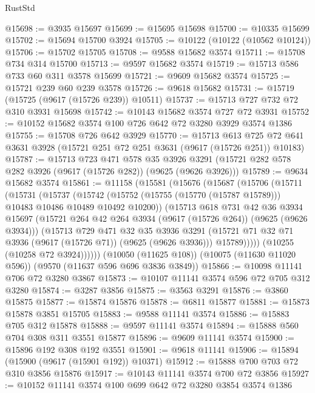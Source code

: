 \begin{lexlean}{RustStd}
\begin{coremodule}
{\begin{coremodule}
{{{{{{{{{{{{{{{{{{{{{{{{{{{{{{{{{@15698 := @3935 @15697
@15699 := @15695 @15698
@15700 := @10335 @15699
@15702 := @15694 @15700 @3924
@15705 := @10122 (@10122 (@10562 @10124))
@15706 := @15702 @15705
@15708 := @9588 @15682 @3574
@15711 := @15708 @734 @314 @15700
@15713 := @9597 @15682 @3574
@15719 := @15713 @586 @733 @60 @311 @3578 @15699
@15721 := @9609 @15682 @3574
@15725 := @15721 @239 @60 @239 @3578
@15726 := @9618 @15682
@15731 := @15719 (@15725 (@9617 (@15726 @239)) @10511)
@15737 := @15713 @727 @732 @72 @310 @3931 @15698
@15742 := @10143 @15682 @3574 @727 @72 @3931
@15752 := @10152 @15682 @3574 @100 @726 @642 @72 @3280 @3929 @3574 @1386
@15755 := @15708 @726 @642 @3929
@15770 := @15713
    @613
    @725
    @72
    @641
    @3631
    @3928
    (@15721 @251 @72 @251 @3631 (@9617 (@15726 @251)) @10183)
@15787 := @15713
    @723
    @471
    @578
    @35
    @3926
    @3291
    (@15721 @282 @578 @282 @3926 (@9617 (@15726 @282)) (@9625 (@9626 @3926)))
@15789 := @9634 @15682 @3574
@15861 := @11158
    (@15581
      (@15676
        (@15687
          (@15706
            (@15711
              (@15731
                (@15737
                  (@15742
                    (@15752 (@15755 (@15770 (@15787 @15789))) @10483 @10486 @10489 @10492 @10200))
                  (@15713
                    @618
                    @731
                    @42
                    @36
                    @3934
                    @15697
                    (@15721 @264 @42 @264 @3934 (@9617 (@15726 @264)) (@9625 (@9626 @3934)))
                    (@15713
                      @729
                      @471
                      @32
                      @35
                      @3936
                      @3291
                      (@15721 @71 @32 @71 @3936 (@9617 (@15726 @71)) (@9625 (@9626 @3936)))
                      @15789)))))
            (@10255 (@10258 @72 @3924))))))
    (@10050 (@11625 @108))
    (@10075 (@11630 @11020 @596))
    (@9570 (@11637 @596 @696 @3836 @3849))
@15866 := @10098 @11141 @706 @72 @3280 @3867
@15873 := @10107 @11141 @3574 @596 @72 @705 @312 @3280
@15874 := @3287 @3856
@15875 := @3563 @3291
@15876 := @3860 @15875
@15877 := @15874 @15876
@15878 := @6811 @15877
@15881 := @15873 @15878 @3851 @15705
@15883 := @9588 @11141 @3574
@15886 := @15883 @705 @312 @15878
@15888 := @9597 @11141 @3574
@15894 := @15888 @560 @704 @308 @311 @3551 @15877
@15896 := @9609 @11141 @3574
@15900 := @15896 @192 @308 @192 @3551
@15901 := @9618 @11141
@15906 := @15894 (@15900 (@9617 (@15901 @192)) @10371)
@15912 := @15888 @700 @703 @72 @310 @3856 @15876
@15917 := @10143 @11141 @3574 @700 @72 @3856
@15927 := @10152 @11141 @3574 @100 @699 @642 @72 @3280 @3854 @3574 @1386
}}}}}}}}}}}}}}}}}}}}}}}}}}}}}}}}}
\end{coremodule}}
\end{coremodule}
\end{lexlean}
